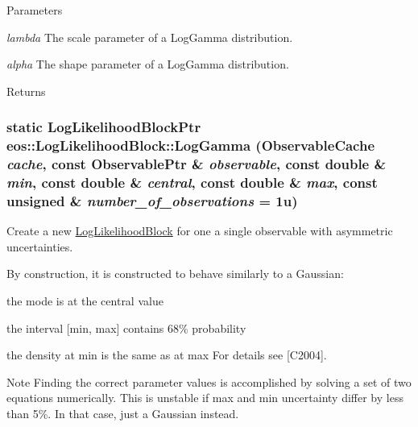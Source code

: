 \begin{DoxyParams}{Parameters}
\item[{\em lambda}]The scale parameter of a LogGamma distribution. \item[{\em alpha}]The shape parameter of a LogGamma distribution. \end{DoxyParams}
\begin{DoxyReturn}{Returns}

\end{DoxyReturn}
\hypertarget{classeos_1_1LogLikelihoodBlock_a3e2ab2f3d4d994c382ecc06cd6453478}{
\subsubsection[{LogGamma}]{\setlength{\rightskip}{0pt plus 5cm}static {\bf LogLikelihoodBlockPtr} eos::LogLikelihoodBlock::LogGamma ({\bf ObservableCache} {\em cache}, \/  const {\bf ObservablePtr} \& {\em observable}, \/  const double \& {\em min}, \/  const double \& {\em central}, \/  const double \& {\em max}, \/  const unsigned \& {\em number\_\-of\_\-observations} = {\ttfamily 1u})}}
\label{classeos_1_1LogLikelihoodBlock_a3e2ab2f3d4d994c382ecc06cd6453478}
Create a new \hyperlink{classeos_1_1LogLikelihoodBlock}{LogLikelihoodBlock} for one a single observable with asymmetric uncertainties.

By construction, it is constructed to behave similarly to a Gaussian:
\begin{DoxyItemize}
\item the mode is at the central value
\item the interval \mbox{[}min, max\mbox{]} contains 68\% probability
\item the density at min is the same as at max For details see \mbox{[}C2004\mbox{]}.
\end{DoxyItemize}

\begin{DoxyNote}{Note}
Finding the correct parameter values is accomplished by solving a set of two equations numerically. This is unstable if max and min uncertainty differ by less than 5\%. In that case, just a Gaussian instead.
\end{DoxyNote}

